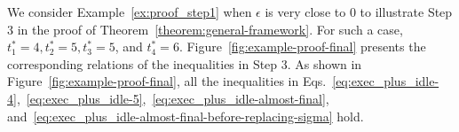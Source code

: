 \begin{example}
  We consider Example~\ref{ex:proof_step1} when $\epsilon$ is very
  close to $0$ to illustrate Step 3 in the proof of
  Theorem~\ref{theorem:general-framework}. For such a case, $t_1^*=4,
  t_2^*=5, t_3^*=5$, and $t_4^*=6$.
  Figure~\ref{fig:example-proof-final} presents the corresponding
  relations of the inequalities in Step 3. 
As shown in Figure~\ref{fig:example-proof-final}, all the inequalities 
  in Eqs.~\eqref{eq:exec_plus_idle-4},~\eqref{eq:exec_plus_idle-5},~\eqref{eq:exec_plus_idle-almost-final}, and~\eqref{eq:exec_plus_idle-almost-final-before-replacing-sigma} hold.
\end{example}


